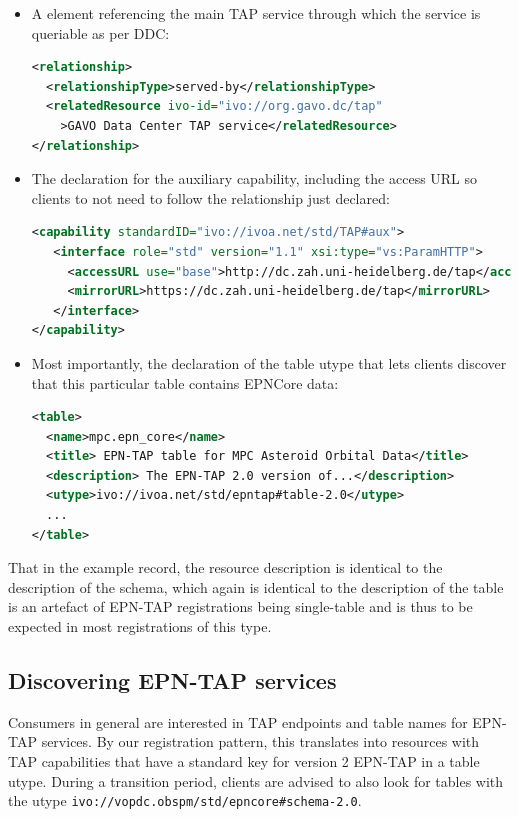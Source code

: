 \documentclass[11pt,a4paper]{ivoa}
\begin{document}
\begin{itemize}
\item A  element referencing the main TAP service 
through which the service is queriable as per DDC:
\begin{lstlisting}[language=XML,basicstyle=\footnotesize]
<relationship>
  <relationshipType>served-by</relationshipType>
  <relatedResource ivo-id="ivo://org.gavo.dc/tap"
    >GAVO Data Center TAP service</relatedResource>
</relationship>
\end{lstlisting}

\item The declaration for the auxiliary capability, including the access
URL so clients to not need to follow the relationship just declared:
\begin{lstlisting}[language=XML,basicstyle=\footnotesize]
<capability standardID="ivo://ivoa.net/std/TAP#aux">
   <interface role="std" version="1.1" xsi:type="vs:ParamHTTP">
     <accessURL use="base">http://dc.zah.uni-heidelberg.de/tap</accessURL>
     <mirrorURL>https://dc.zah.uni-heidelberg.de/tap</mirrorURL>
   </interface>
</capability>
\end{lstlisting}

\item Most importantly, the declaration of the table utype that lets
clients discover that this particular table contains EPNCore data:
\begin{lstlisting}[language=XML,basicstyle=\footnotesize]
<table>
  <name>mpc.epn_core</name>
  <title> EPN-TAP table for MPC Asteroid Orbital Data</title>
  <description> The EPN-TAP 2.0 version of...</description>
  <utype>ivo://ivoa.net/std/epntap#table-2.0</utype>
  ...
</table>
\end{lstlisting}
\end{itemize}

That in the example record, the resource description is identical to the
description of the schema, which again is identical to the description
of the table is an artefact of EPN-TAP registrations being single-table
and is thus to be expected in most registrations of this type.

\subsection{Discovering EPN-TAP services}

Consumers in general are interested in TAP endpoints and table names for
EPN-TAP services.  By our registration pattern, this translates into
resources with TAP capabilities that have a standard key for version 2
EPN-TAP in a table utype.  During a transition period, clients are
advised to also look for tables with the utype
\verb|ivo://vopdc.obspm/std/epncore#schema-2.0|.
\end{document}
